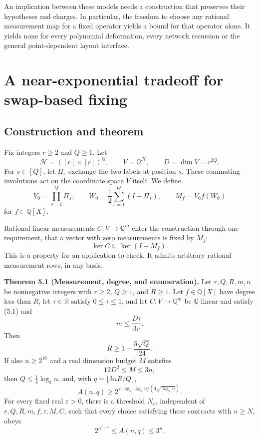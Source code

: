 \documentclass[11pt,letterpaper]{article}
\newenvironment{manualstatement}{%
  \par\addvspace{0.7\baselineskip}\begingroup\itshape\noindent\ignorespaces
}{\par\endgroup\addvspace{0.4\baselineskip}}
\begin{document}
An implication between these models needs a construction that preserves
their hypotheses and charges. In particular, the freedom to choose any
rational measurement map for a fixed operator yields a bound for that
operator alone. It yields none for every polynomial deformation, every
network recursion or the general point-dependent layout interface.

\section{A near-exponential tradeoff for swap-based
fixing}\label{a-near-exponential-tradeoff-for-swap-based-fixing}

\subsection{Construction and theorem}\label{construction-and-theorem}

Fix integers \(r\ge2\) and \(Q\ge1\). Let \[\mathcal H=([r]\times[r])^Q,
\qquad V=\mathbb Q^{\mathcal H},
\qquad D=\dim V=r^{2Q}.\] For \(s\in[Q]\), let \(\Pi_s\) exchange the
two labels at position \(s\). These commuting involutions act on the
coordinate space \(V\) itself. We define \[V_0=\prod_{s=1}^Q\Pi_s,
\qquad W_0=\frac12\sum_{s=1}^Q(I-\Pi_s),
\qquad M_f=V_0f(W_0)\] for \(f\in\mathbb Q[X]\).

Rational linear measurements \(C:V\to\mathbb Q^m\) enter the
construction through one requirement, that a vector with zero
measurements is fixed by \(M_f\):
\[\ker C\subseteq\ker(I-M_f).                 \tag{5.1}\] This is a
property for an application to check. It admits arbitrary rational
measurement rows, in any basis.

\begin{manualstatement}

{{\upshape \textbf{Theorem 5.1 (Measurement, degree, and
enumeration).}}} Let \(r,Q,R,m,n\) be nonnegative integers with
\(r\ge2\), \(Q\ge1\), and \(R\ge1\). Let \(f\in\mathbb Q[X]\) have
degree less than \(R\), let \(\tau\in\mathbb R\) satisfy
\(0\le\tau\le1\), and let \(C:V\to\mathbb Q^m\) be \(\mathbb Q\)-linear
and satisfy (5.1) and
\[m\le\frac{D\tau}{3r}.                       \tag{5.2}\] Then
\[R\ge1+\frac{5\sqrt Q}{24}.                  \tag{5.3}\] If also
\(n\ge2^{16}\) and a real dimension budget \(M\) satisfies
\[12D^2\le M\le3n,                            \tag{5.4}\] then
\(Q\le\tfrac14\log_2 n\), and, with \(q=\lfloor3nR/Q\rfloor\),
\[A(n,q)\ge
2^{\,n\log_2\log_2 n/(4\sqrt{\log_2 n})}.   \tag{5.5}\] For every fixed
real \(\varepsilon>0\), there is a threshold \(N_\varepsilon\),
independent of \(r,Q,R,m,f,\tau,M,C\), such that every choice satisfying
these contracts with \(n\ge N_\varepsilon\) obeys
\[2^{n^{1-\varepsilon}}\le A(n,q)\le3^n.       \tag{5.6}\]

\end{manualstatement}
\end{document}
